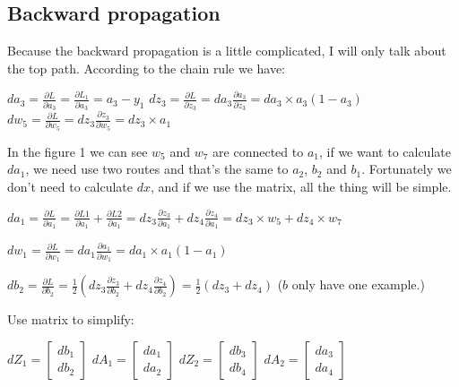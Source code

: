 \documentclass[10pt]{article}
\begin{document}
    \subsection*{Backward propagation}
    \begin{flushleft}
        Because the backward propagation is a little complicated, I will only talk about the top path. According to the chain rule we have:\vspace{3ex}

        $da_3 = \frac{\partial L}{\partial a_3} = \frac{\partial L_1}{\partial a_3} = a_3 - y_1$ \qquad    
        $dz_3 = \frac{\partial L}{\partial z_3} = da_3\frac{\partial a_3}{\partial z_3} = da_3\times a_3(1-a_3)$ \qquad 
        $dw_5 = \frac{\partial L}{\partial w_5} = dz_3\frac{\partial z_3}{\partial w_5} = dz_3\times a_1$ \vspace{2ex}

        In the figure 1 we can see $w_5$ and $w_7$ are connected to $a_1$, if we want to calculate $da_1$, we need use two routes and that's the same to $a_2$, $b_2$ and $b_1$. Fortunately we don't need to calculate $dx$, and if we use the matrix, all the thing will be simple.\vspace{3ex}
        
        $da_1= \frac{\partial L}{\partial a_1} = \frac{\partial L1}{\partial a_1} + \frac{\partial L2}{\partial a_1} = dz_3\frac{\partial z_3}{\partial a_1} + dz_4\frac{\partial z_4}{\partial a_1} = dz_3 \times w_5 + dz_4 \times w_7$ \vspace{1ex}
        
        $dw_1 = \frac{\partial L}{\partial w_1} = da_1\frac{\partial a_1}{\partial w_1} = da_1\times a_1(1-a_1)$ \vspace{1ex}
        
        $db_2 = \frac{\partial L}{\partial b_2} = \frac{1}{2}(dz_3 \frac{\partial z_3}{\partial b_2} + dz_4 \frac{\partial z_4}{\partial b_2}) =\frac{1}{2}(dz_3+dz_4)$ \qquad ($b$ only have one example.)\vspace{3ex}

        Use matrix to simplify:
        \begin{center}
            $dZ_1 = \begin{bmatrix}
                db_1 \\
                db_2
            \end{bmatrix}$ \quad
            $dA_1 = \begin{bmatrix}
                da_1 \\
                da_2
            \end{bmatrix}$ \quad
            $dZ_2 = \begin{bmatrix}
                db_3 \\
                db_4
            \end{bmatrix}$ \quad
            $dA_2 = \begin{bmatrix}
                da_3 \\
                da_4
            \end{bmatrix}$ \vspace{3ex}
        \end{center}
        

\end{flushleft}
\end{document}
